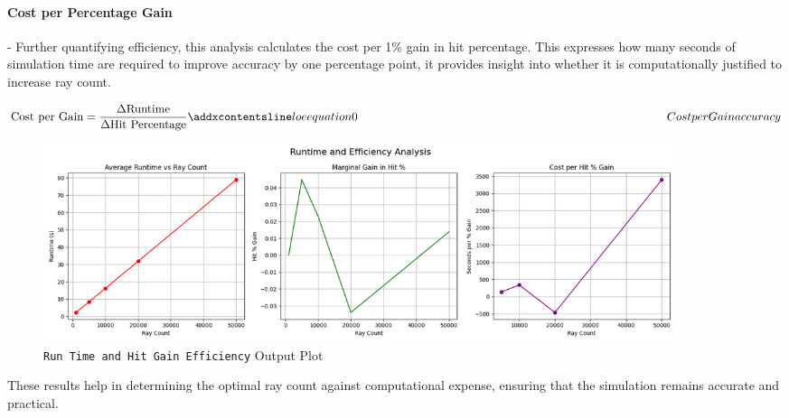 \paragraph{\textbf{Cost per Percentage Gain}}
- Further quantifying efficiency, this analysis calculates the cost per 1\% gain in hit percentage. This expresses how many seconds of simulation time are required to improve accuracy by one percentage point, it provides insight into whether it is computationally justified to increase ray count. 

\begin{equation}
    \text{Cost per Gain} = \frac{\Delta \text{Runtime}}{\Delta \text{Hit Percentage}}
    \label{eq:Cost_per_Gain}
    \addequation{Cost per Gain accuracy}
\end{equation}

\vspace{1em}


\begin{figure}[htbp] %
    \centering
    \includegraphics[width=0.9\textwidth]{chapters/methodology/SoftwareModel/images/run time analysis.png} %
    \caption{\texttt{Run Time and Hit Gain Efficiency} Output Plot}       %
    \label{fig:Run Time and Hit Gain Efficiency}            %
\end{figure}  

These results help in determining the optimal ray count against computational expense, ensuring that the simulation remains accurate and practical.



